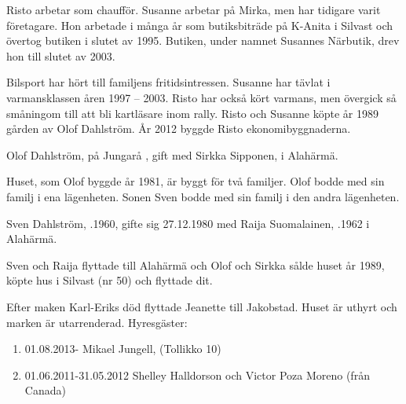 Risto arbetar som chaufför. Susanne arbetar på Mirka, men har tidigare varit företagare. Hon arbetade i många år som butiksbiträde på K-Anita i Silvast och övertog butiken i slutet av 1995. Butiken, under namnet Susannes Närbutik, drev hon till slutet av 2003.

Bilsport har hört till familjens fritidsintressen. Susanne har tävlat i varmansklassen åren 1997 – 2003. Risto har också kört varmans, men övergick så småningom till att bli kartläsare inom rally. Risto och Susanne köpte år 1989 gården av Olof Dahlström. År 2012 byggde Risto ekonomibyggnaderna.


%
Olof Dahlström,  på Jungarå , gift med Sirkka Sipponen,  i Alahärmä.
\begin{jhchildren}
  \item {}
  \item {}
  \item {}
\end{jhchildren}

Huset, som Olof byggde år 1981, är byggt för två familjer. Olof bodde med sin familj i ena lägenheten. Sonen Sven bodde med sin familj i den andra lägenheten.

Sven Dahlström, .1960, gifte sig 27.12.1980 med Raija Suomalainen, .1962 i Alahärmä.
\begin{jhchildren}
  \item {}
  \item {}
\end{jhchildren}

Sven och Raija flyttade till Alahärmä och Olof och Sirkka sålde huset år 1989, köpte hus i Silvast (nr 50) och flyttade dit.



%



%
Efter maken Karl-Eriks död flyttade Jeanette till Jakobstad. Huset är uthyrt och marken är utarrenderad.
Hyresgäster:
\begin{enumerate}
  \item 01.08.2013-   Mikael Jungell,  (Tollikko 10)
  \item 01.06.2011-31.05.2012  Shelley Halldorson och Victor Poza Moreno (från Canada)
\end{enumerate}


